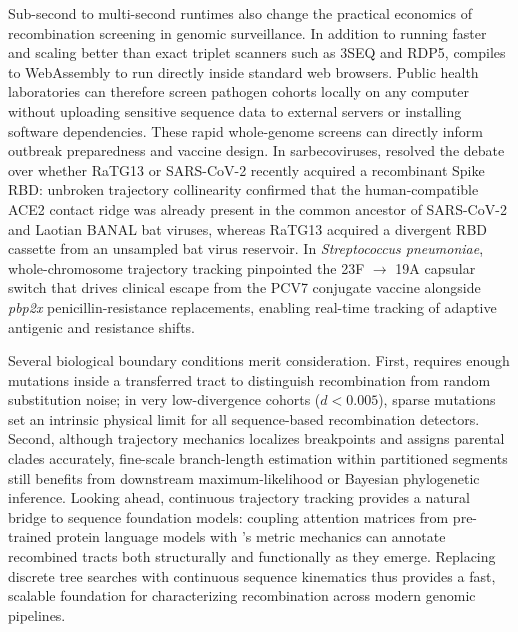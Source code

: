 Sub-second to multi-second runtimes also change the practical economics of recombination screening in genomic surveillance. In addition to running faster and scaling better than exact triplet scanners such as 3SEQ and RDP5, \RhizAeon compiles to WebAssembly to run directly inside standard web browsers. Public health laboratories can therefore screen pathogen cohorts locally on any computer without uploading sensitive sequence data to external servers or installing software dependencies. These rapid whole-genome screens can directly inform outbreak preparedness and vaccine design. In sarbecoviruses, \RhizAeon resolved the debate over whether RaTG13 or SARS-CoV-2 recently acquired a recombinant Spike RBD: unbroken trajectory collinearity confirmed that the human-compatible ACE2 contact ridge was already present in the common ancestor of SARS-CoV-2 and Laotian BANAL bat viruses, whereas RaTG13 acquired a divergent RBD cassette from an unsampled bat virus reservoir. In \textit{Streptococcus pneumoniae}, whole-chromosome trajectory tracking pinpointed the 23F $\to$ 19A capsular switch that drives clinical escape from the PCV7 conjugate vaccine alongside \textit{pbp2x} penicillin-resistance replacements, enabling real-time tracking of adaptive antigenic and resistance shifts.

Several biological boundary conditions merit consideration. First, \RhizAeon requires enough mutations inside a transferred tract to distinguish recombination from random substitution noise; in very low-divergence cohorts ($d < 0.005$), sparse mutations set an intrinsic physical limit for all sequence-based recombination detectors. Second, although trajectory mechanics localizes breakpoints and assigns parental clades accurately, fine-scale branch-length estimation within partitioned segments still benefits from downstream maximum-likelihood or Bayesian phylogenetic inference. Looking ahead, continuous trajectory tracking provides a natural bridge to sequence foundation models: coupling attention matrices from pre-trained protein language models with \RhizAeon's metric mechanics can annotate recombined tracts both structurally and functionally as they emerge. Replacing discrete tree searches with continuous sequence kinematics thus provides a fast, scalable foundation for characterizing recombination across modern genomic pipelines.
